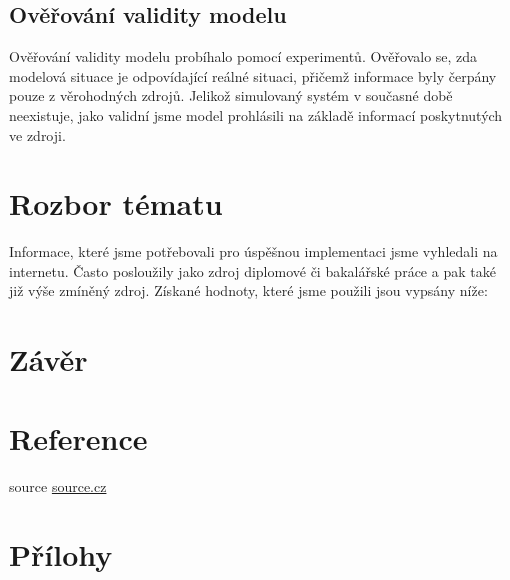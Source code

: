 \documentclass[11pt,a4paper]{article}
\begin{document}
    \subsection{Ověřování validity modelu}

      Ověřování validity modelu probíhalo pomocí experimentů. Ověřovalo se, zda
      modelová situace je odpovídající reálné situaci, přičemž informace byly
      čerpány pouze z věrohodných zdrojů. Jelikož simulovaný systém v současné
      době neexistuje, jako validní jsme model prohlásili na základě informací
      poskytnutých ve zdroji.

  \section{Rozbor tématu}

    Informace, které jsme potřebovali pro úspěšnou implementaci jsme vyhledali
    na internetu. Často posloužily jako zdroj diplomové či bakalářské práce a 
    pak také již výše zmíněný zdroj. Získané hodnoty, které jsme použili jsou vypsány níže:


  \section{Závěr}



  \section{Reference}

    \begin{enumerate}[label={[\arabic*]}]
      \item source \href{source}{source.cz}
    \end{enumerate}

  \appendix
  \newpage

  \section{Přílohy}
\end{document}
